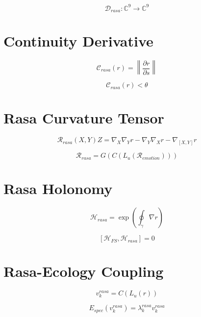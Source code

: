 \[
\mathcal{D}_{rasa} : \mathbb{C}^9 \to \mathbb{C}^9
\]


\section*{Continuity Derivative}

\[
\mathcal{C}_{rasa}(r)
= \left\| \frac{\partial r}{\partial s} \right\|
\]

\[
\mathcal{C}_{rasa}(r) < \theta
\]


\section*{Rasa Curvature Tensor}

\[
\mathcal{R}_{rasa}(X,Y)Z
= \nabla_X \nabla_Y r
- \nabla_Y \nabla_X r
- \nabla_{[X,Y]} r
\]

\[
\mathcal{R}_{rasa}
= G(C(L_u(\mathcal{R}_{emotion})))
\]


\section*{Rasa Holonomy}

\[
\mathcal{H}_{rasa}
= \exp\left( \oint_{\gamma} \nabla r \right)
\]

\[
[\mathcal{H}_{FS}, \mathcal{H}_{rasa}] = 0
\]


\section*{Rasa-Ecology Coupling}

\[
v_k^{rasa}
= C(L_u(r))
\]

\[
E_{spec}(v_k^{rasa}) = \lambda_k^{rasa} v_k^{rasa}
\]


